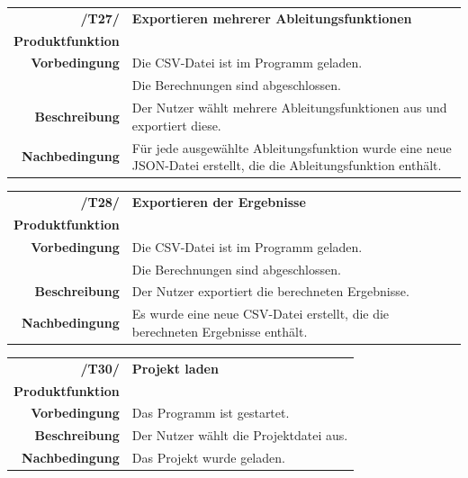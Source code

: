 \documentclass{article}
\begin{document}
\begin{table}[H]
\begin{tabularx}{\textwidth}{rX} \vspace{1mm}
\textbf{/T27/}         & \textbf{Exportieren mehrerer Ableitungsfunktionen}  \\ \vspace{1mm}
\textbf{Produktfunktion} & \nameref{sec:f:Attributsableitungen exportieren} \\
\textbf{Vorbedingung}  & Die CSV-Datei ist im Programm geladen. \\ \vspace{1mm} & Die Berechnungen sind abgeschlossen.   \\ \vspace{1mm}
\textbf{Beschreibung}  & Der Nutzer wählt mehrere Ableitungsfunktionen aus und exportiert diese. \\
\textbf{Nachbedingung} & Für jede ausgewählte Ableitungsfunktion wurde eine neue JSON-Datei erstellt, die die Ableitungsfunktion enthält.
\end{tabularx}
\end{table}

\begin{table}[H]
\begin{tabularx}{\textwidth}{rX} \vspace{1mm}
\textbf{/T28/}         & \textbf{Exportieren der Ergebnisse}  \\ \vspace{1mm}
\textbf{Produktfunktion} & \nameref{sec:f:Ergebnisse exportieren} \\
\textbf{Vorbedingung}  & Die CSV-Datei ist im Programm geladen. \\ \vspace{1mm} & Die Berechnungen sind abgeschlossen.   \\ \vspace{1mm}
\textbf{Beschreibung}  & Der Nutzer exportiert die berechneten Ergebnisse. \\
\textbf{Nachbedingung} & Es wurde eine neue CSV-Datei erstellt, die die berechneten Ergebnisse enthält.
\end{tabularx}
\end{table}

\begin{table}[H]
\begin{tabularx}{\textwidth}{rX}
 \vspace{1mm}
\textbf{/T30/}         & \textbf{Projekt laden} \\ \vspace{1mm}
\textbf{Produktfunktion} & \nameref{sec:f:Projekt laden} \\ \vspace{1mm}
\textbf{Vorbedingung}  & Das Programm ist gestartet.   \\ \vspace{1mm}
\textbf{Beschreibung}  & Der Nutzer wählt die Projektdatei aus. \\
\textbf{Nachbedingung} & Das Projekt wurde geladen.
\end{tabularx}
\end{table}
\end{document}
